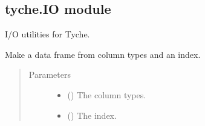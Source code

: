 \documentclass[letterpaper,10pt,english]{sphinxmanual}
\begin{document}
\subsection{tyche.IO module}
\label{\detokenize{doc-src/tyche:module-tyche.IO}}\label{\detokenize{doc-src/tyche:tyche-io-module}}
I/O utilities for Tyche.

\begin{fulllineitems}
\label{\detokenize{doc-src/tyche:tyche.IO.make_table}}
Make a data frame from column types and an index.
\begin{quote}\begin{description}
\item[{Parameters}] \leavevmode\begin{itemize}
\item {} 
 () \textendash{} The column types.

\item {} 
 () \textendash{} The index.

\end{itemize}

\end{description}\end{quote}

\end{fulllineitems}

\end{document}
